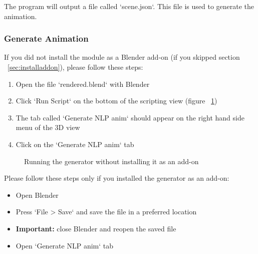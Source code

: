 \noindent The program will output a file called `scene.json`. This file is used to generate the animation.

\subsubsection{Generate Animation}
\noindent If you did not install the module as a Blender add-on (if you skipped section ~\ref{sec:installaddon}), please follow these steps:
\begin{enumerate}
	\item Open the file `rendered.blend` with Blender
	\item Click `Run Script` on the bottom of the scripting view (figure ~\ref{fig:withoutaddon})
	\item The tab called `Generate NLP anim` should appear on the right hand side menu of the 3D view
	\item Click on the `Generate NLP anim` tab
\end{enumerate}

\begin{figure}[H]
	\centerline{}
	\caption{Running the generator without installing it as an add-on}\label{fig:withoutaddon}
\end{figure}

Please follow these steps only if you installed the generator as an add-on:
\begin{itemize}
	\item Open Blender
	\item Press `File > Save` and save the file in a preferred location
	\item \textbf{Important:} close Blender and reopen the saved file
	\item Open `Generate NLP anim` tab
\end{itemize}

